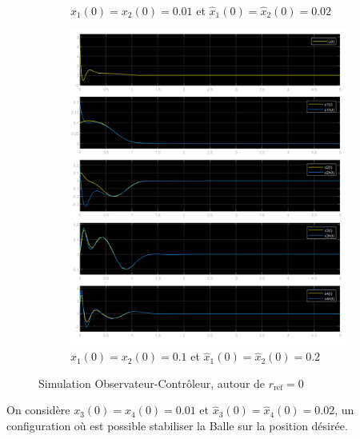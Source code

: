 \documentclass[class=article, crop=false]{standalone}
\begin{document}
\begin{resolution}
\begin{figure}[H]
\begin{subfigure}[b]{0.45\textwidth}
            \caption{$x_1(0) = x_2(0) = 0.01$ et $\hat{x}_1(0) = \hat{x}_2(0) = 0.02$}
        \end{subfigure}
        \begin{subfigure}[b]{0.45\textwidth}
            \centering
            \includegraphics[width=\textwidth]{../images/m5_r0_s0.1_o0.2.png}
            \caption{$x_1(0) = x_2(0) = 0.1$ et $\hat{x}_1(0) = \hat{x}_2(0) = 0.2$}
        \end{subfigure}
        \caption{Simulation Observateur-Contrôleur, autour de $r_{\text{ref}} = 0$}
    \end{figure}
    On considère $x_3(0) = x_4(0) = 0.01$ et $\hat{x}_3(0) = \hat{x}_4(0) = 0.02$, un configuration où est possible stabiliser la Balle sur la position désirée.
\end{resolution}

\newpage
\end{document}
